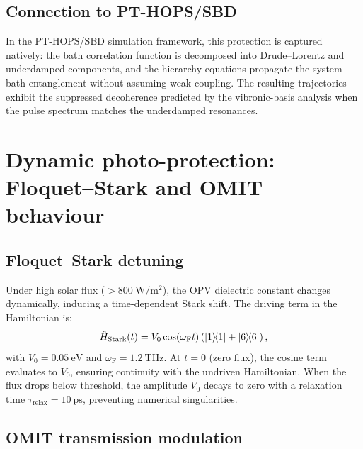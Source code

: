 \documentclass[11pt,a4paper]{article}
\begin{document}
\subsection{Connection to PT-HOPS/SBD}

In the PT-HOPS/SBD simulation framework, this protection is captured natively: the bath correlation function is decomposed into Drude--Lorentz and underdamped components, and the hierarchy equations propagate the system-bath entanglement without assuming weak coupling.
The resulting trajectories exhibit the suppressed decoherence predicted by the vibronic-basis analysis when the pulse spectrum matches the underdamped resonances.


\section{Dynamic photo-protection: Floquet--Stark and OMIT behaviour}
\label{SI-sec:npq}

\subsection{Floquet--Stark detuning}

Under high solar flux ($> \qty{800}{\W\per\m\squared}$), the OPV dielectric constant changes dynamically, inducing a time-dependent Stark shift.
The driving term in the Hamiltonian is:
\begin{equation}
\hat{H}_{\mathrm{Stark}}(t) = V_0 \cos(\omega_{\mathrm{F}} t) \left( \dyad{1}{1} + \dyad{6}{6} \right),
\label{eq:SI_stark_detuning}
\end{equation}
with $V_0 = \qty{0.05}{\eV}$ and $\omega_{\mathrm{F}} = \qty{1.2}{\THz}$.
At $t = 0$ (zero flux), the cosine term evaluates to $V_0$, ensuring continuity with the undriven Hamiltonian.
When the flux drops below threshold, the amplitude $V_0$ decays to zero with a relaxation time $\tau_{\mathrm{relax}} = \qty{10}{\ps}$, preventing numerical singularities.

\subsection{OMIT transmission modulation}
\end{document}
